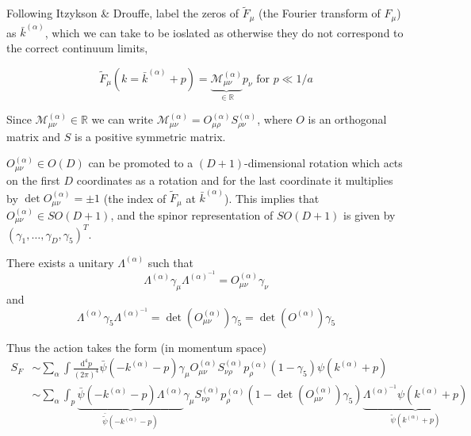 Following Itzykson \& Drouffe, label the zeros of $\tilde F_\mu$ (the Fourier transform of $F_\mu$) as $\bar{k}^{(\alpha)}$, which we can take to be ioslated as otherwise they do not correspond to the correct continuum limits, 

\begin{equation}
    \tilde F_\mu(k = \bar{k}^{(\alpha)}+ p) = \underset{\in \mathbb{R}}{\underbrace{\mathcal{M}_{\mu \nu}^{(\alpha)}}} p_\nu \text{ for }p \ll 1/a
\end{equation}

Since \(\mathcal{M}_{\mu \nu}^{(\alpha)} \in \mathbb{R}\) we can write \(\mathcal{M}_{\mu \nu}^{(\alpha)}=O_{\mu \rho}^{(\alpha)} S_{\rho \nu}^{(\alpha)}\), where $O$ is an orthogonal matrix and $S$ is a positive symmetric matrix.

$O_{\mu \nu}^{(\alpha)} \in O(D)$ can be promoted to a $(D+1)$-dimensional rotation which acts on the first $D$ coordinates as a rotation and for the last coordinate it multiplies by $\operatorname{det} O_{\mu \nu}^{(\alpha)} = \pm 1$ (the index of $\tilde{F}_\mu$ at $\bar k^{(\alpha)}$).
%
This implies that $O_{\mu \nu}^{(\alpha)} \in SO(D+1)$, and the spinor representation of $SO(D+1)$ is given by $(\gamma_1, \ldots, \gamma_D, \gamma_5)^T$.

There exists a unitary $\Lambda^{(\alpha)}$ such that
\begin{equation}
    \Lambda^{(\alpha)} \gamma_\mu \Lambda^{(\alpha)^{-1}} = O_{\mu \nu}^{(\alpha)} \gamma_\nu
\end{equation}
and
\begin{equation}
    \Lambda^{(\alpha)} \gamma_5 \Lambda^{(\alpha)^{-1}} = \operatorname{det}(O_{\mu \nu}^{(\alpha)}) \gamma_5 = \operatorname{det}(O^{(\alpha)})\gamma_5
\end{equation}

Thus the action takes the form (in momentum space)
\begin{align}
    S_F &\sim \sum_\alpha \int \frac{\text{d}^4p}{(2 \pi)^4}\bar{\psi}(-k^{(\alpha)}-p) \gamma_\mu O_{\mu \nu}^{(\alpha)}S_{\nu \rho}^{(\alpha)}p_\rho^{(\alpha)}(1 - \gamma_5)\psi(k^{(\alpha)}+p) \nonumber \\
    &\sim \sum_\alpha \int_p \underset{\bar{\tilde{\psi}}(-k^{(\alpha)}-p)}{\underbrace{\bar{\psi}(-k^{(\alpha)}-p) \Lambda^{(\alpha)} }} \gamma_\mu S_{\nu \rho}^{(\alpha)} p_\rho^{(\alpha)} (1 - \operatorname{det}(O_{\mu \nu}^{(\alpha)}) \gamma_5)\underset{\tilde{\psi}(k^{(\alpha)}+p)}{\underbrace{\Lambda^{(\alpha)^{-1}}\psi(k^{(\alpha)}+p)}}
\end{align}

